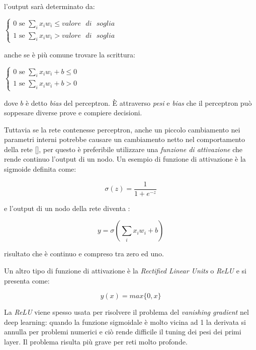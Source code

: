 \documentclass[12pt,a4paper]{report}
\begin{document}
l'output sarà determinato da:

\begin{center}
$\begin{cases}
 0 \text{ se } \sum_{i} x_{i}w_{i} \leq valore\text{ }di\text{ }soglia\\
 1 \text{ se } \sum_{i} x_{i}w_{i} > valore\text{ }di\text{ }soglia 
\end{cases} $
\end{center}

anche se è più comune trovare la scrittura:

\begin{center}
$\begin{cases}
 0 \text{ se } \sum_{i} x_{i}w_{i} + b \leq 0\\
 1 \text{ se } \sum_{i} x_{i}w_{i} + b > 0
\end{cases}$
\end{center}

dove $b$ è detto \textit{bias} del perceptron.
È attraverso \textit{pesi} e \textit{bias} che il perceptron può soppesare diverse prove e compiere decisioni.

Tuttavia se la rete contenesse perceptron, anche un piccolo cambiamento nei parametri interni potrebbe causare un cambiamento netto nel comportamento della rete [\cite{neural-net-nielsen}], per questo è preferibile utilizzare una \textit{funzione di attivazione} che rende continuo l'output di un nodo.
Un esempio di funzione di attivazione è la sigmoide definita come:

\begin{equation} \label{sigma}
 \sigma(z) = \frac{1}{1+e^{-z}} 
\end{equation}

e l'output di un nodo della rete diventa :

\begin{equation} \label{z}
  y = \sigma(\sum_{i}{x_{i}w_{i}} + b)
\end{equation}

risultato che è continuo e compreso tra zero ed uno.

Un altro tipo di funzione di attivazione è la \textit{Rectified Linear Units} o \textit{ReLU} e si presenta come:

\begin{equation}
 y(x) = max \{0,x\} 
\end{equation}

La \textit{ReLU} viene spesso usata per risolvere il problema del \textit{vanishing gradient} nel deep learning: quando la funzione sigmoidale è molto vicina ad 1 la derivata si annulla per problemi numerici e ciò rende difficile il tuning dei pesi dei primi layer. Il problema risulta più grave per reti molto profonde.
\end{document}
